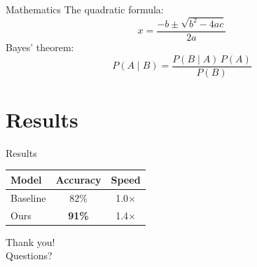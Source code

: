 \documentclass[aspectratio=169]{beamer}
\begin{document}
\begin{frame}{Mathematics}
  The quadratic formula:
  \[
    x = \frac{-b \pm \sqrt{b^2 - 4ac}}{2a}
  \]
  \pause
  Bayes' theorem:
  \[
    P(A \mid B) = \frac{P(B \mid A)\, P(A)}{P(B)}
  \]
\end{frame}

\section{Results}

\begin{frame}{Results}
  \centering
  \begin{tabular}{lcc}
    \toprule
    Model & Accuracy & Speed \\
    \midrule
    Baseline & 82\% & 1.0$\times$ \\
    Ours & \textbf{91\%} & 1.4$\times$ \\
    \bottomrule
  \end{tabular}
\end{frame}

\begin{frame}
  \centering
  \Huge Thank you!\\[1em]
  \large Questions?
\end{frame}
\end{document}

